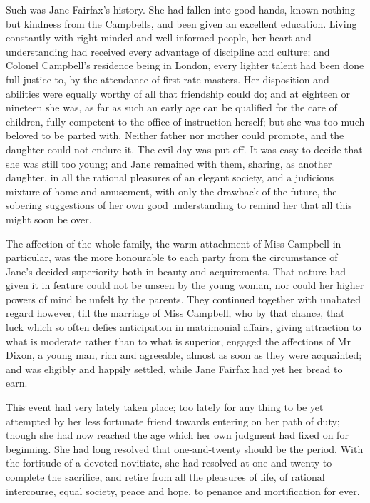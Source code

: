 Such was Jane Fairfax's history. She had fallen into good hands, known nothing but kindness from the Campbells, and been given an excellent education. Living constantly with right-minded and well-informed people, her heart and understanding had received every advantage of discipline and culture; and Colonel Campbell's residence being in London, every lighter talent had been done full justice to, by the attendance of first-rate masters. Her disposition and abilities were equally worthy of all that friendship could do; and at eighteen or nineteen she was, as far as such an early age can be qualified for the care of children, fully competent to the office of instruction herself; but she was too much beloved to be parted with. Neither father nor mother could promote, and the daughter could not endure it. The evil day was put off. It was easy to decide that she was still too young; and Jane remained with them, sharing, as another daughter, in all the rational pleasures of an elegant society, and a judicious mixture of home and amusement, with only the drawback of the future, the sobering suggestions of her own good understanding to remind her that all this might soon be over.

The affection of the whole family, the warm attachment of Miss Campbell in particular, was the more honourable to each party from the circumstance of Jane's decided superiority both in beauty and acquirements. That nature had given it in feature could not be unseen by the young woman, nor could her higher powers of mind be unfelt by the parents. They continued together with unabated regard however, till the marriage of Miss Campbell, who by that chance, that luck which so often defies anticipation in matrimonial affairs, giving attraction to what is moderate rather than to what is superior, engaged the affections of Mr Dixon, a young man, rich and agreeable, almost as soon as they were acquainted; and was eligibly and happily settled, while Jane Fairfax had yet her bread to earn.

This event had very lately taken place; too lately for any thing to be yet attempted by her less fortunate friend towards entering on her path of duty; though she had now reached the age which her own judgment had fixed on for beginning. She had long resolved that one-and-twenty should be the period. With the fortitude of a devoted novitiate, she had resolved at one-and-twenty to complete the sacrifice, and retire from all the pleasures of life, of rational intercourse, equal society, peace and hope, to penance and mortification for ever.

